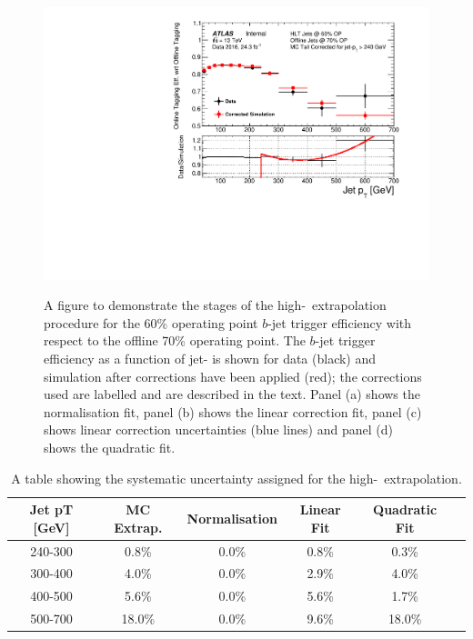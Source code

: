 \begin{figure}[!ht]
\begin{center}
   {\includegraphics[width=0.47\linewidth, angle=0]{figs/Trigger/Full_GRL_bslt2mm_effCorrFitQuad_jetPt.pdf}}
\end{center}
\vspace{-0.8em}
\caption[A figure to demonstrate the stages of the high-\pT~extrapolation procedure for the $b$-jet trigger efficiency measurement.]
        {A figure to demonstrate the stages of the high-\pT~extrapolation procedure for the 60\% operating point $b$-jet trigger efficiency with respect to the offline 70\% operating point.
          The $b$-jet trigger efficiency as a function of jet-\pT{} is shown for data (black) and simulation after corrections have been applied (red);
          the corrections used are labelled and are described in the text.
          Panel (a) shows the normalisation fit,
          panel (b) shows the linear correction fit,
          panel (c) shows linear correction uncertainties (blue lines) and
          panel (d) shows the quadratic fit.
        }
        \label{fig:bTrig_mcExtrap}
\end{figure}

\vspace{0.5em}
\begin{table}[!ht]
  \begin{center}
\begin{tabular}{|c||c||c|c|c|c|}
  \hline
  Jet pT [GeV] & MC Extrap. & Normalisation & Linear Fit  & Quadratic Fit \\
  \hline
  240-300 &  0.8\% & 0.0\% & 0.8\% &  0.3\% \\
  300-400 &  4.0\% & 0.0\% & 2.9\% &  4.0\% \\
  400-500 &  5.6\% & 0.0\% & 5.6\% &  1.7\% \\
  500-700 & 18.0\% & 0.0\% & 9.6\% & 18.0\% \\
  \hline
\end{tabular}
\caption{A table showing the systematic uncertainty assigned for the high-\pT~extrapolation.}
\label{tab:bTrig_extrapSyst}
\vspace{-1em}
  \end{center}
\end{table}



